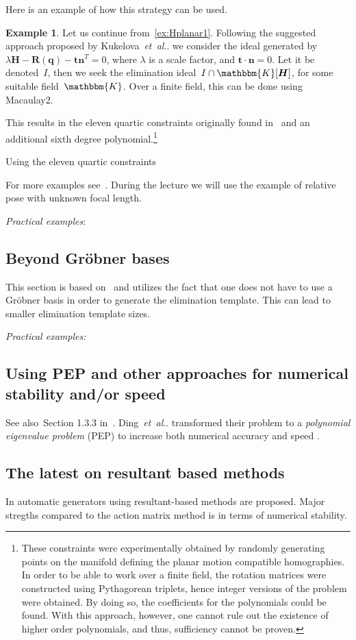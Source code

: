 \documentclass[11pt,a4paper]{article}
\makeatletter
\theoremstyle{definition}
\newtheorem{example}{Example}
\newcommand{\mat}[1]{\bm{#1}}
\newcommand{\K}{\ensuremath{\mathbbm{K}}}
\DeclareRobustCommand\etal{\emph{et~al}\@ifnextchar.{}{.\@}}
\makeatother
\begin{document}
Here is an example of how this strategy can be used.
\begin{example}
Let us continue from~\cref{ex:Hplanar1}.
Following the suggested approach proposed by Kukelova~\etal{} we
consider the ideal generated by
\mbox{$\lambda \mat{H}-\mat{R}(\mat{q})-\mat{tn}^{T}=0$}, where $\lambda$ is a scale factor,
and $\mat{t}\cdot\mat{n}=0$. Let it be denoted~$I$,
then we seek the elimination ideal~$I\cap\K[\mat{H}]$, for some suitable field~$\K$.
Over a finite field, this can be done using Macaulay2.

This results in the eleven quartic constraints originally found
in~\cite{wadenback2016} and an additional sixth degree polynomial.\footnote{
These constraints were experimentally obtained by randomly generating points on the manifold defining
the planar motion compatible homographies.
In order to be able to work over a finite field, the rotation matrices were constructed
using Pythagorean triplets, hence integer versions of the problem were obtained. By doing so,
the coefficients for the polynomials could be found.
With this approach, however, one cannot rule out the existence of higher order polynomials,
and thus, sufficiency cannot be proven.}

Using the eleven quartic constraints
\end{example}

For more examples see~\cite{kukelova-etal-2017-cvpr}.
During the lecture we will use the example of relative pose with unknown focal length.

\emph{Practical examples}: \cite{ding-etal-2019-iccv,barath-kukelova-iccv-2019,valtonenoernhag-icpram-2019}

\subsection{Beyond Gröbner bases}
This section is based on~\cite{larsson2018cvpr} and utilizes the fact that one does not
have to use a Gröbner basis in order to generate the elimination template.
This can lead to smaller elimination template sizes.

\emph{Practical examples:}~\cite{valtonenoernhag-springer-2021}

\subsection{Using PEP and other approaches for numerical stability and/or speed}
See also~Section 1.3.3 in~\cite{larsson-phd}.
Ding~\etal{} transformed their problem to a \emph{polynomial eigenvalue problem} (PEP)
to increase both numerical accuracy and speed \cite{ding-etal-tpami-2020,ding-etal-cvpr-2020}.

\subsection{The latest on resultant based methods}
In \cite{bhayani-etal-cvpr-2020,bhayani-etal-arxiv-2020} automatic generators using
resultant-based methods are proposed. Major stregths compared to the action matrix method is
in terms of numerical stability.


{\small
}
\end{document}
